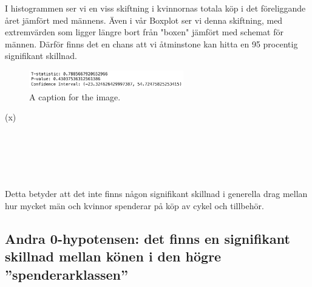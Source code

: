 \documentclass[]{article}
\begin{document}
I histogrammen ser vi en viss skiftning i kvinnornas totala köp i det föreliggande året jämfört med männens. Även i vår Boxplot ser vi denna skiftning, med extremvärden som ligger längre bort från "boxen" jämfört med schemat för männen. Därför finns det en chans att vi åtminstone kan hitta en 95 procentig signifikant skillnad.
\begin{figure}[h]
    \centering
    \includegraphics[width=0.6\textwidth]{img_gender_total_purchase_ytd.png}
    \caption{A caption for the image.}
\end{figure}
\if(x)
\\\\\\\\
\fi

Detta betyder att det inte finns någon signifikant skillnad i generella drag mellan hur mycket män och kvinnor spenderar på köp av cykel och tillbehör.

\subsection{Andra 0-hypotensen: det finns en signifikant skillnad mellan könen i den högre ''spenderarklassen''}
\end{document}
